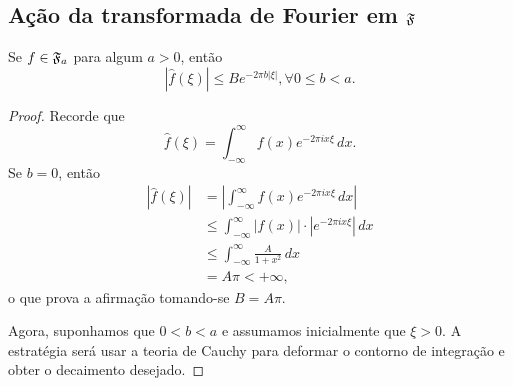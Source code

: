     \subsection{Ação da transformada de Fourier em \texorpdfstring{$\mathfrak{F}$}{F}}
        \begin{teorema}
        \label{teo-transf-fourier-decai-exp}
            Se $f\in\mathfrak{F}_a$ para algum $a>0$, então
            \begin{equation*}
                |\widehat{f}(\xi)| \leq Be^{-2\pi b|\xi|}, \forall 0\leq b < a.
            \end{equation*}
        \end{teorema}
        \begin{proof}
            Recorde que
            \begin{equation*}
            \widehat{f}(\xi) = \int_{-\infty}^{\infty} f(x) e^{-2\pi ix\xi} \, dx.
            \end{equation*}
            Se $b=0$, então
            \begin{align*}
                |\widehat{f}(\xi)| &= \left| \int_{-\infty}^{\infty} f(x) e^{-2\pi ix\xi} \, dx \right| \\
                                   &\leq \int_{-\infty}^{\infty} |f(x)|\cdot |e^{-2\pi ix\xi}| \, dx \\
                                   &\leq \int_{-\infty}^{\infty} \frac{A}{1+x^2} \, dx \\
                                   &= A\pi < +\infty,
            \end{align*}
            o que prova a afirmação tomando-se $B=A\pi$.
            
            Agora, suponhamos que $0 < b < a$ e assumamos inicialmente que $\xi > 0$.
            A estratégia será usar a teoria de Cauchy para deformar o contorno de integração e obter
            o decaimento desejado.
            

\end{proof}

